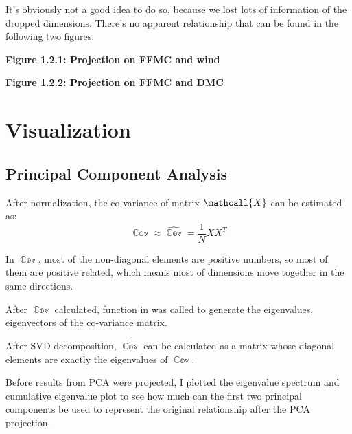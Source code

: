 \documentclass[titlepage,a4paper,12pt,thmsb]{report}
\begin{document}
It's obviously not a good idea to do so, because we lost lots of information of the dropped dimensions. There's no apparent relationship that can be found in the following two figures.

\begin{figure}
{\par}
\end{figure}
\begin{center}


{\bf{Figure 1.2.1: Projection on FFMC and wind}}


\newpage


\begin{figure}
{\par}
\end{figure}

{\bf{Figure 1.2.2: Projection on FFMC and DMC}}
\end{center}

\newpage

\section{Visualization}

\subsection{Principal Component Analysis}



After normalization, the co-variance of matrix $\mathcall{X}$ can be estimated as:
$$\mathop{\mathbb{Cov}[X]} \approx \widehat{\mathop{\mathbb{Cov}[X]}} = \frac{1}{N} X X^T $$

In ${\mathop{\mathbb{Cov}[X]}}$, most of the non-diagonal elements are positive numbers, so most of them are positive related, which means most of dimensions move together in the same directions.

After ${\mathop{\mathbb{Cov}[X]}}$ calculated,  function in  was called to generate the eigenvalues, eigenvectors of the co-variance matrix.

After SVD decomposition, $\widetilde{\mathop{\mathbb{Cov}[X]}}$ can be calculated as a matrix whose diagonal elements are exactly the eigenvalues of ${\mathop{\mathbb{Cov}[X]}}$.

Before results from PCA were projected, I plotted the eigenvalue spectrum and cumulative eigenvalue plot to see how much can the first two principal components be used to represent the original relationship after the PCA projection.
\end{document}
